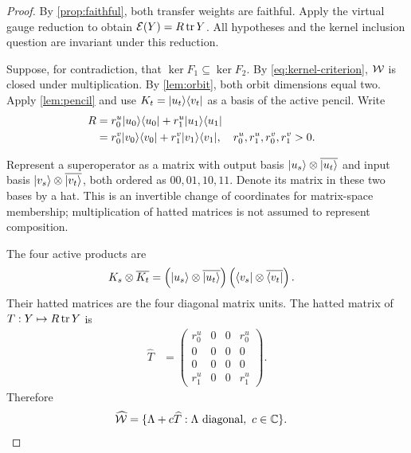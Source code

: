 \begin{proof}
	By \cref{prop:faithful}, both transfer weights are faithful.
	Apply the virtual gauge reduction to obtain $\mathcal{E}(Y)=R\operatorname{tr} Y$.
	All hypotheses and the kernel inclusion question are invariant
	under this reduction.

	Suppose, for contradiction, that
	$\ker F_1\subseteq\ker F_2$.
	By \cref{eq:kernel-criterion}, $\mathcal{W}$ is closed under multiplication.
	By \cref{lem:orbit}, both orbit dimensions equal two.
	Apply \cref{lem:pencil} and use
	$K_t=\lvert u_t\rangle\langle v_t\rvert$ as a basis of the active pencil.
	Write
	\begin{align}
		R                       & =r_0^u\lvert u_0\rangle\langle u_0\rvert +r_1^u\lvert u_1\rangle\langle u_1\rvert
		\nonumber                                                                    \\
		                        & =r_0^v\lvert v_0\rangle\langle v_0\rvert +r_1^v\lvert v_1\rangle\langle v_1\rvert,
		                        &
		r_0^u,r_1^u,r_0^v,r_1^v & >0.
		\label{eq:two-diagonalizations}
	\end{align}

	Represent a superoperator as a matrix with output basis
	$\lvert u_s\rangle\otimes\overline{\lvert u_t\rangle}$ and input basis
	$\lvert v_s\rangle\otimes\overline{\lvert v_t\rangle}$, both ordered as
	$00,01,10,11$. Denote its matrix in these two bases by a hat.
	This is an invertible change of coordinates for matrix-space
	membership; multiplication of hatted matrices is not assumed to
	represent composition.

	The four active products are
	\begin{align}
		K_s\otimes\overline{K_t}
		 & =
		\left(\lvert u_s\rangle\otimes\overline{\lvert u_t\rangle}\right)
		\left(\langle v_s\rvert\otimes\overline{\langle v_t\rvert}\right).
	\end{align}
	Their hatted matrices are the four diagonal matrix units.
	The hatted matrix of $T:Y\mapsto R\operatorname{tr} Y$ is
	\begin{align}
		\widehat T
		 & =
		\begin{pmatrix}
			r_0^u & 0 & 0 & r_0^u \\
			0     & 0 & 0 & 0     \\
			0     & 0 & 0 & 0     \\
			r_1^u & 0 & 0 & r_1^u
		\end{pmatrix}.
		\label{eq:T-mixed-bases}
	\end{align}
	Therefore
	\begin{align}
		\widehat{\mathcal{W}}
		 & =\{\Lambda+c\widehat T:
		\Lambda\ \text{diagonal},\ c\in\mathbb{C}\}.
		\label{eq:W-mixed-bases}
	\end{align}


\end{proof}
